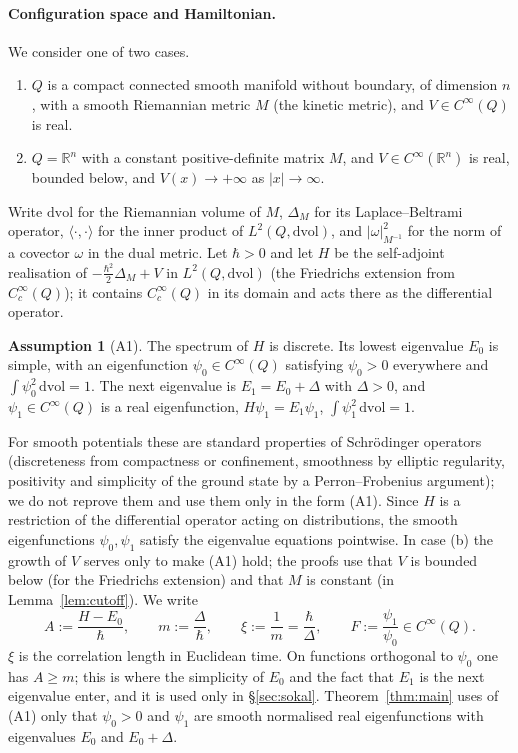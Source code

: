 \documentclass[11pt,a4paper]{article}
\theoremstyle{definition}
\newtheorem{assumption}[theorem]{Assumption}
\theoremstyle{remark}
\newcommand{\R}{\mathbb{R}}
\newcommand{\dvol}{\,\mathrm{dvol}}
\begin{document}
\paragraph{Configuration space and Hamiltonian.}
We consider one of two cases.
\begin{enumerate}[label=(\alph*)]
\item $Q$ is a compact connected smooth manifold without boundary, of dimension $n$, with a smooth Riemannian metric $M$ (the kinetic metric), and $V\in C^\infty(Q)$ is real.
\item $Q=\R^n$ with a constant positive-definite matrix $M$, and $V\in C^\infty(\R^n)$ is real, bounded below, and $V(x)\to+\infty$ as $|x|\to\infty$.
\end{enumerate}

Write $\mathrm{dvol}$ for the Riemannian volume of $M$, $\Delta_M$ for its Laplace--Beltrami operator, $\langle\cdot,\cdot\rangle$ for the inner product of $L^2(Q,\mathrm{dvol})$, and $|\omega|_{M^{-1}}^2$ for the norm of a covector $\omega$ in the dual metric.
Let $\hbar>0$ and let $H$ be the self-adjoint realisation of $-\tfrac{\hbar^2}{2}\Delta_M+V$ in $L^2(Q,\mathrm{dvol})$ (the Friedrichs extension from $C_c^\infty(Q)$); it contains $C_c^\infty(Q)$ in its domain and acts there as the differential operator.

\begin{assumption}[A1]\label{ass:A1}
The spectrum of $H$ is discrete.
Its lowest eigenvalue $E_0$ is simple, with an eigenfunction $\psi_0\in C^\infty(Q)$ satisfying $\psi_0>0$ everywhere and $\int\psi_0^2\dvol=1$.
The next eigenvalue is $E_1=E_0+\Delta$ with $\Delta>0$, and $\psi_1\in C^\infty(Q)$ is a real eigenfunction, $H\psi_1=E_1\psi_1$, $\int\psi_1^2\dvol=1$.
\end{assumption}

For smooth potentials these are standard properties of Schr\"odinger operators (discreteness from compactness or confinement, smoothness by elliptic regularity, positivity and simplicity of the ground state by a Perron--Frobenius argument); we do not reprove them and use them only in the form (A1).
Since $H$ is a restriction of the differential operator acting on distributions, the smooth eigenfunctions $\psi_0,\psi_1$ satisfy the eigenvalue equations pointwise.
In case (b) the growth of $V$ serves only to make (A1) hold; the proofs use that $V$ is bounded below (for the Friedrichs extension) and that $M$ is constant (in Lemma~\ref{lem:cutoff}).
We write
\[
  A:=\frac{H-E_0}{\hbar},\qquad m:=\frac{\Delta}{\hbar},\qquad \xi:=\frac1m=\frac{\hbar}{\Delta},\qquad F:=\frac{\psi_1}{\psi_0}\in C^\infty(Q).
\]
$\xi$ is the correlation length in Euclidean time.
On functions orthogonal to $\psi_0$ one has $A\ge m$; this is where the simplicity of $E_0$ and the fact that $E_1$ is the next eigenvalue enter, and it is used only in \S\ref{sec:sokal}.
Theorem~\ref{thm:main} uses of (A1) only that $\psi_0>0$ and $\psi_1$ are smooth normalised real eigenfunctions with eigenvalues $E_0$ and $E_0+\Delta$.
\end{document}
